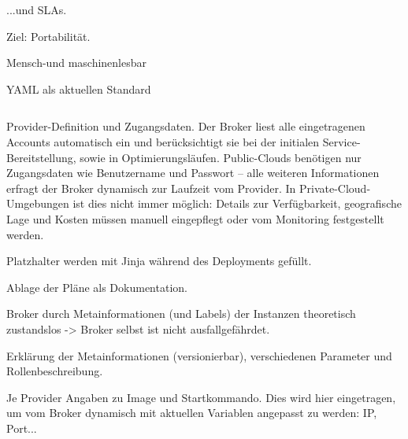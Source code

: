 


...und SLAs.

Ziel: Portabilität.

Mensch-und maschinenlesbar

YAML als aktuellen Standard

%
%
\begin{listing}[ht]	
	\inputminted[]{yaml}{./src/provider.sample.yaml}
	\caption{Provider-Definition und Zugangsdaten. Der Broker liest alle eingetragenen Accounts automatisch ein und berücksichtigt sie bei der initialen Service-Bereitstellung, sowie in Optimierungsläufen. Public-Clouds benötigen nur Zugangsdaten wie Benutzername und Passwort -- alle weiteren Informationen erfragt der Broker dynamisch zur Laufzeit vom Provider. In Private-Cloud-Umgebungen ist dies nicht immer möglich: Details zur Verfügbarkeit, geografische Lage und Kosten müssen manuell eingepflegt oder vom Monitoring festgestellt werden.}
	\label{listing:provider}
\end{listing}



Platzhalter werden mit Jinja während des Deployments gefüllt.

Ablage der Pläne als Dokumentation.

Broker durch Metainformationen (und Labels) der Instanzen theoretisch zustandslos -> Broker selbst ist nicht ausfallgefährdet.

Erklärung der Metainformationen (versionierbar), verschiedenen Parameter und Rollenbeschreibung.

Je Provider Angaben zu Image und Startkommando. Dies wird hier eingetragen, um vom Broker dynamisch mit aktuellen Variablen angepasst zu werden: IP, Port...

